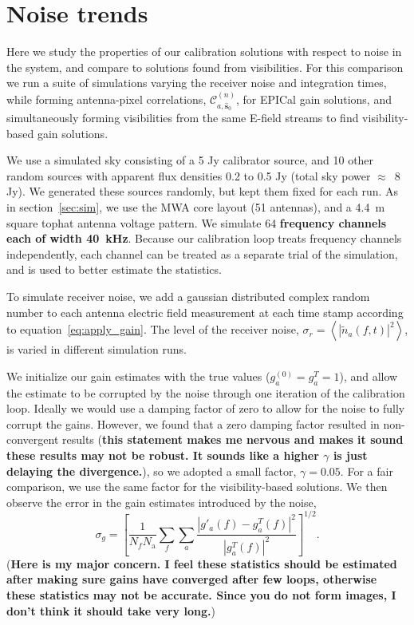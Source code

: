 \documentclass[a4paper,fleqn,usenatbib]{../mnras}
\newcommand{\Nant}{\ensuremath{N_{\mathrm{a}}}}
\newcommand{\spix}{\ensuremath{\hat{\mathbf{s}}_{0}}}
\newcommand{\Cna}[1][n]{\ensuremath{\mathcal{C}^{(#1)}_{a,\spix}}}
\newcommand{\damp}{\ensuremath{\gamma}}
\begin{document}
\section{Noise trends}\label{sec:noise}
Here we study the properties of our calibration solutions with respect to noise in the system, and compare to solutions found from visibilities. For this comparison we run a suite of simulations varying the receiver noise and integration times, while forming antenna-pixel correlations, $\Cna$, for EPICal gain solutions, and simultaneously forming visibilities from the same E-field streams to find visibility-based gain solutions.

We use a simulated sky consisting of a 5 Jy calibrator source, and 10 other random sources with apparent flux densities 0.2 to 0.5 Jy (total sky power $\approx$~8 Jy). We generated these sources randomly, but kept them fixed for each run. As in section~\ref{sec:sim}, we use the MWA core layout (51 antennas), and a 4.4~m square tophat antenna voltage pattern. We simulate 64 {\bf frequency channels each of width 40~kHz}. Because our calibration loop treats frequency channels independently, each channel can be treated as a separate trial of the simulation, and is used to better estimate the statistics.

To simulate receiver noise, we add a gaussian distributed complex random number to each antenna electric field measurement at each time stamp according to equation~\ref{eq:apply_gain}. The level of the receiver noise, $\sigma_r = \left<\left|\widetilde{n}_a(f,t)\right|^2\right>$, is varied in different simulation runs. 

We initialize our gain estimates with the true values (${g^{(0)}_a=g^T_a=1}$), and allow the estimate to be corrupted by the noise through one iteration of the calibration loop. Ideally we would use a damping factor of zero to allow for the noise to fully corrupt the gains. However, we found that a zero damping factor resulted in non-convergent results ({\bf this statement makes me nervous and makes it sound these results may not be robust. It sounds like a higher $\damp$ is just delaying the divergence.}), so we adopted a small factor, $\damp=0.05$. For a fair comparison, we use the same factor for the visibility-based solutions. We then observe the error in the gain estimates introduced by the noise,
\begin{equation}\label{eq:gain_error}
\sigma_g = \left[\frac{1}{N_f \Nant} \sum_f \sum_a \frac{\left|g'_a(f)-g^T_a(f)\right|^2}{\left|g^T_a(f)\right|^2}\right]^{1/2}.
\end{equation}
({\bf Here is my major concern. I feel these statistics should be estimated after making sure gains have converged after few loops, otherwise these statistics may not be accurate. Since you do not form images, I don't think it should take very long.})
\end{document}
